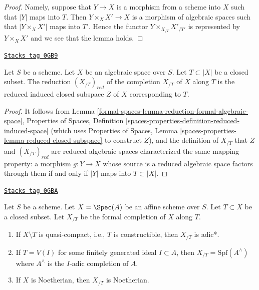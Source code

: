 \begin{proof}
Namely, suppose that $Y \to X$ is a morphism from a scheme into $X$ such
that $|Y|$ maps into $T$. Then $Y \times_X X' \to X$ is a morphism of
algebraic spaces such that $|Y \times_X X'|$ maps into $T'$. Hence the
functor $Y \times_{X_{/T}} X'_{/T'}$ is represented by $Y \times_X X'$
and we see that the lemma holds.
\end{proof}

\begin{lemma}
\label{formal-spaces-lemma-reduction-completion}
\href{https://stacks.math.columbia.edu/tag/0GB9}{\texttt{Stacks tag 0GB9}}

Let $S$ be a scheme. Let $X$ be an algebraic space over $S$.
Let $T \subset |X|$ be a closed subset. The reduction $(X_{/T})_{red}$
of the completion $X_{/T}$ of $X$ along $T$ is
the reduced induced closed subspace $Z$ of $X$ corresponding to $T$.
\end{lemma}

\begin{proof}
It follows from Lemma \ref{formal-spaces-lemma-reduction-formal-algebraic-space},
Properties of Spaces, Definition
\ref{spaces-properties-definition-reduced-induced-space}
(which uses Properties of Spaces, Lemma
\ref{spaces-properties-lemma-reduced-closed-subspace} to construct $Z$),
and the definition of $X_{/T}$ that
$Z$ and $(X_{/T})_{red}$ are reduced algebraic spaces
characterized the same mapping property:
a morphism $g : Y \to X$ whose source is a reduced algebraic space
factors through them if and only if $|Y|$ maps into $T \subset |X|$.
\end{proof}

\begin{lemma}
\label{formal-spaces-lemma-affine-formal-completion-types}
\href{https://stacks.math.columbia.edu/tag/0GBA}{\texttt{Stacks tag 0GBA}}

Let $S$ be a scheme. Let $X = \Spec(A)$ be an affine scheme over $S$.
Let $T \subset X$ be a closed subset. Let $X_{/T}$ be the
formal completion of $X$ along $T$.
\begin{enumerate}
\item If $X \setminus T$ is quasi-compact, i.e., $T$ is constructible,
then $X_{/T}$ is adic*.
\item If $T = V(I)$ for some finitely generated ideal $I \subset A$,
then $X_{/T} = \text{Spf}(A^\wedge)$ where $A^\wedge$ is the
$I$-adic completion of $A$.
\item If $X$ is Noetherian, then $X_{/T}$ is Noetherian.
\end{enumerate}
\end{lemma}

